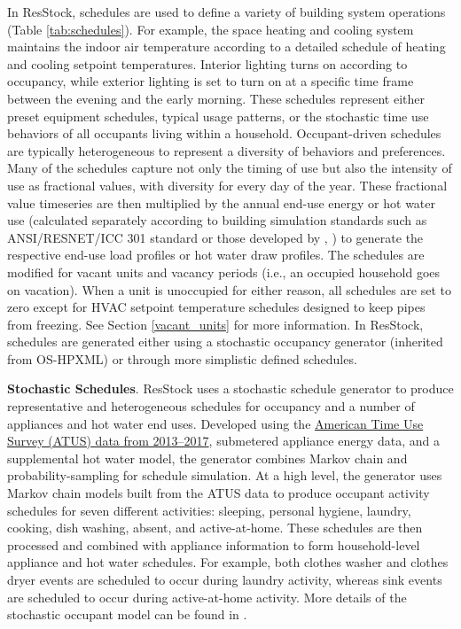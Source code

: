 In ResStock, schedules are used to define a variety of building system operations (Table \ref{tab:schedules}). For example, the space heating and cooling system maintains the indoor air temperature according to a detailed schedule of heating and cooling setpoint temperatures. Interior lighting turns on according to occupancy, while exterior lighting is set to turn on at a specific time frame between the evening and the early morning. These schedules represent either preset equipment schedules, typical usage patterns, or the stochastic time use behaviors of all occupants living within a household. Occupant-driven schedules are typically heterogeneous to represent a diversity of behaviors and preferences. Many of the schedules capture not only the timing of use but also the intensity of use as fractional values, with diversity for every day of the year. These fractional value timeseries are then multiplied by the annual end-use energy or hot water use (calculated separately according to building simulation standards such as ANSI/RESNET/ICC 301 standard or those developed by \cite{bahsp_2010}, \cite{bahsp_2014}) to generate the respective end-use load profiles or hot water draw profiles. The schedules are modified for vacant units and vacancy periods (i.e., an occupied household goes on vacation). When a unit is unoccupied for either reason, all schedules are set to zero except for HVAC setpoint temperature schedules designed to keep pipes from freezing. See Section \ref{vacant_units} for more information. In ResStock, schedules are generated either using a stochastic occupancy generator (inherited from OS-HPXML) or through more simplistic defined schedules. %

\textbf{Stochastic Schedules}. ResStock uses a stochastic schedule generator to produce representative and heterogeneous schedules for occupancy and a number of appliances and hot water end uses. Developed using the \href{https://www.bls.gov/tus/}{American Time Use Survey (ATUS) data from 2013--2017}, submetered appliance energy data, and a supplemental hot water model, the generator combines Markov chain and probability-sampling for schedule simulation. At a high level, the generator uses Markov chain models built from the ATUS data to produce occupant activity schedules for seven different activities: sleeping, personal hygiene, laundry, cooking, dish washing, absent, and active-at-home. These schedules are then processed and combined with appliance information to form household-level appliance and hot water schedules. For example, both clothes washer and clothes dryer events are scheduled to occur during laundry activity, whereas sink events are scheduled to occur during active-at-home activity. More details of the stochastic occupant model can be found in \citet{Chen2022}.

